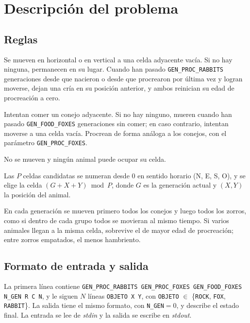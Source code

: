 \documentclass[11pt,a4paper]{article}
\begin{document}
\section{Descripción del problema}
\subsection{Reglas}
\begin{description}[leftmargin=1.2em]
  \item[Conejos.] Se mueven en horizontal o en vertical a una celda adyacente vacía. Si no hay ninguna,
    permanecen en su lugar. Cuando han pasado \texttt{GEN\_PROC\_RABBITS} generaciones desde que nacieron o
    desde que procrearon por última vez y logran moverse, dejan una cría en su posición anterior, y ambos
    reinician su edad de procreación a cero.
  \item[Zorros.] Intentan comer un conejo adyacente. Si no hay ninguno, mueren cuando han pasado
    \texttt{GEN\_FOOD\_FOXES} generaciones sin comer; en caso contrario, intentan moverse a una celda vacía.
    Procrean de forma análoga a los conejos, con el parámetro \texttt{GEN\_PROC\_FOXES}.
  \item[Rocas.] No se mueven y ningún animal puede ocupar su celda.
  \item[Selección de celda.] Las $P$ celdas candidatas se numeran desde 0 en sentido horario (N, E, S, O), y se
    elige la celda $(G + X + Y) \bmod P$, donde $G$ es la generación actual y $(X,Y)$ la posición del animal.
  \item[Conflictos.] En cada generación se mueven primero todos los conejos y luego todos los zorros, como
    si dentro de cada grupo todos se movieran al mismo tiempo. Si varios animales llegan a la misma celda,
    sobrevive el de mayor edad de procreación; entre zorros empatados, el menos hambriento.
\end{description}

\subsection{Formato de entrada y salida}
La primera línea contiene \texttt{GEN\_PROC\_RABBITS GEN\_PROC\_FOXES GEN\_FOOD\_FOXES N\_GEN R C N}, y le
siguen $N$ líneas \texttt{OBJETO X Y}, con \texttt{OBJETO} $\in$ \{\texttt{ROCK}, \texttt{FOX},
\texttt{RABBIT}\}. La salida tiene el mismo formato, con \texttt{N\_GEN}$=0$, y describe el estado final.
La entrada se lee de \emph{stdin} y la salida se escribe en \emph{stdout}.
\end{document}
